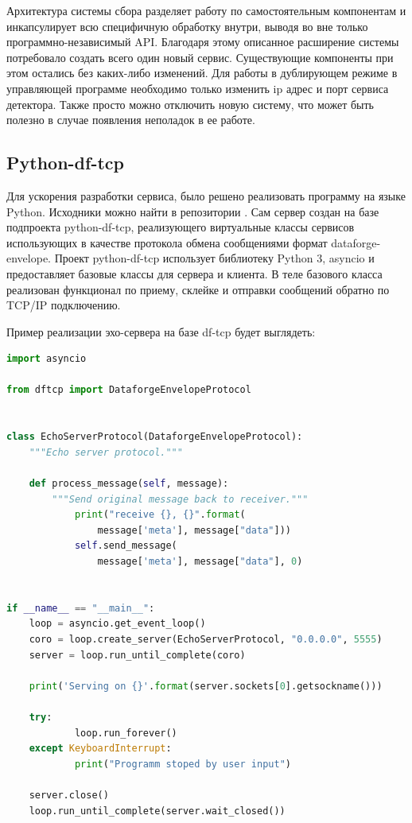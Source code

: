 \documentclass[a4paper,14pt]{extreport}
\begin{document}
Архитектура системы сбора разделяет работу по самостоятельным компонентам и инкапсулирует всю специфичную обработку внутри, выводя во вне только программно-независимый API. Благодаря этому описанное расширение системы потребовало создать всего один новый сервис. Существующие компоненты при этом остались без  каких-либо изменений. Для работы в дублирующем режиме в управляющей программе необходимо только изменить ip адрес и порт сервиса детектора. Также просто можно отключить новую систему, что может быть полезно в случае появления неполадок в ее работе.

\subsection{Python-df-tcp}
Для ускорения разработки сервиса, было решено реализовать программу на языке Python. Исходники можно найти в репозитории \cite{counter-redirecter}. Сам сервер создан на базе подпроекта python-df-tcp\cite{python-df-tcp}, реализующего виртуальные классы сервисов использующих в качестве протокола обмена сообщениями формат dataforge-envelope. Проект python-df-tcp использует библиотеку Python 3, asyncio и предоставляет базовые классы для сервера и клиента. В теле базового класса реализован функционал по приему, склейке и отправки сообщений обратно по TCP/IP подключению.

Пример реализации эхо-сервера на базе df-tcp будет выглядеть:
\begin{lstlisting}[language=Python,style=protobuf]
import asyncio

from dftcp import DataforgeEnvelopeProtocol


class EchoServerProtocol(DataforgeEnvelopeProtocol):
    """Echo server protocol."""

    def process_message(self, message):
        """Send original message back to receiver."""
            print("receive {}, {}".format(
                message['meta'], message["data"]))
            self.send_message(
                message['meta'], message["data"], 0)


if __name__ == "__main__":
    loop = asyncio.get_event_loop()
    coro = loop.create_server(EchoServerProtocol, "0.0.0.0", 5555)
    server = loop.run_until_complete(coro)

    print('Serving on {}'.format(server.sockets[0].getsockname()))

    try:
            loop.run_forever()
    except KeyboardInterrupt:
            print("Programm stoped by user input")

    server.close()
    loop.run_until_complete(server.wait_closed())
\end{lstlisting}
\end{document}
